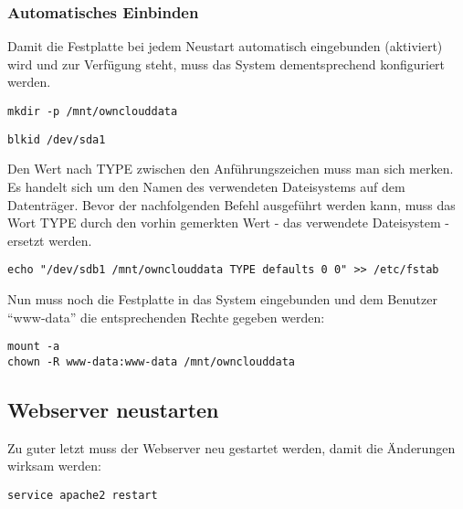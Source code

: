 \subsubsection{Automatisches Einbinden}
Damit die Festplatte bei jedem Neustart automatisch eingebunden (aktiviert) wird und zur Verfügung steht, muss das System dementsprechend konfiguriert werden. 

\begin{lstlisting}
mkdir -p /mnt/ownclouddata
\end{lstlisting}

\begin{lstlisting}
blkid /dev/sda1
\end{lstlisting}

Den Wert nach TYPE zwischen den Anführungszeichen muss man sich merken. Es handelt sich um den Namen des verwendeten Dateisystems auf dem Datenträger.
Bevor der nachfolgenden Befehl ausgeführt werden kann, muss das Wort TYPE durch den vorhin gemerkten Wert - das verwendete Dateisystem - ersetzt werden.

\begin{lstlisting}
echo "/dev/sdb1 /mnt/ownclouddata TYPE defaults 0 0" >> /etc/fstab
\end{lstlisting}

Nun muss noch die Festplatte in das System eingebunden und dem Benutzer ``www-data'' die entsprechenden Rechte gegeben werden:

\begin{lstlisting}
mount -a
chown -R www-data:www-data /mnt/ownclouddata
\end{lstlisting}

\subsection{Webserver neustarten}
Zu guter letzt muss der Webserver neu gestartet werden, damit die Änderungen wirksam werden:

\begin{lstlisting}
service apache2 restart
\end{lstlisting}
